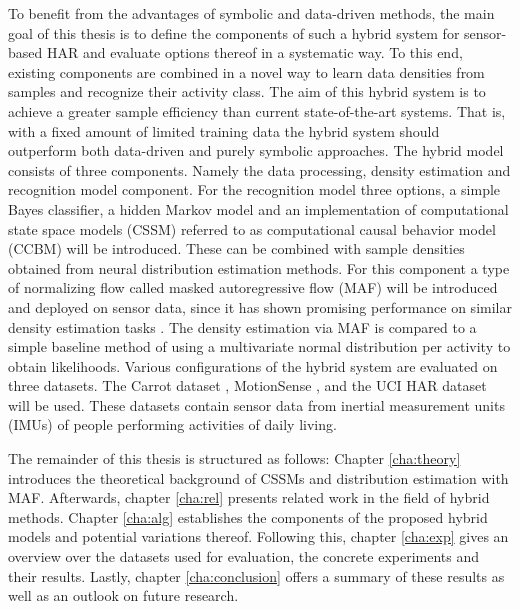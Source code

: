 \documentclass[11pt,titlepage,oneside,openany]{book}
\begin{document}
To benefit from the advantages of symbolic and data-driven methods, the main goal of this thesis is to define the components of such a hybrid system for sensor-based HAR and evaluate options thereof in a systematic way. To this end, existing components are combined in a novel way to learn data densities from samples and recognize their activity class. The aim of this hybrid system is to achieve a greater sample efficiency than current state-of-the-art systems. That is, with a fixed amount of limited training data the hybrid system should outperform both data-driven and purely symbolic approaches. The hybrid model consists of three components. Namely the data processing, density estimation and recognition model component. For the recognition model three options, a simple Bayes classifier, a hidden Markov model and an implementation of computational state space models (CSSM) \cite{kruger_computational_2014} referred to as computational causal behavior model (CCBM) will be introduced. These can be combined with sample densities obtained from neural distribution estimation methods. For this component a type of normalizing flow called masked autoregressive flow (MAF) \cite{papamakarios_masked_2017} will be introduced and deployed on sensor data, since it has shown promising performance on similar density estimation tasks \cite{kobyzev_normalizing_2021}. The density estimation via MAF is compared to a simple baseline method of using a multivariate normal distribution per activity to obtain likelihoods. Various configurations of the hybrid system are evaluated on three datasets. The Carrot dataset \cite{kruger_recognising_2011}, MotionSense \cite{malekzadeh_mobile_2019}, and the UCI HAR dataset \cite{anguita_public_2013} will be used. These datasets contain sensor data from inertial measurement units (IMUs) of people performing activities of daily living.

The remainder of this thesis is structured as follows: Chapter \ref{cha:theory} introduces the theoretical background of CSSMs and distribution estimation with MAF. Afterwards, chapter \ref{cha:rel} presents related work in the field of hybrid methods. Chapter \ref{cha:alg} establishes the components of the proposed hybrid models and potential variations thereof. Following this, chapter \ref{cha:exp} gives an overview over the datasets used for evaluation, the concrete experiments and their results. Lastly, chapter \ref{cha:conclusion} offers a summary of these results as well as an outlook on future research.

\end{document}
